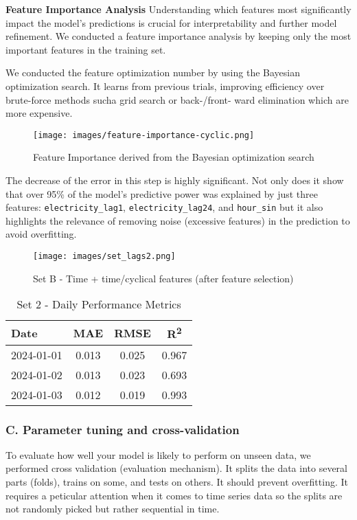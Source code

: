 \textbf{Feature Importance Analysis} Understanding which features 
most significantly impact the model's predictions is crucial for 
interpretability and further model refinement. We conducted a feature 
importance analysis by keeping only the most important features in the 
training set.

We conducted  the feature optimization number by using the Bayesian optimization search.
It learns from previous trials, improving efficiency over brute-force methods sucha grid 
search or back-/front- ward elimination which are more expensive.

\begin{figure}[h!]
    \centering
    \texttt{[image: images/feature-importance-cyclic.png]}
    \caption{Feature Importance derived from the Bayesian optimization search}
    \label{fig:feature-importance}
\end{figure}

The decrease of the error in this step is highly significant. Not only does it 
show that over 95\% of the model's predictive power was explained by just three 
features: \texttt{electricity\_lag1}, \texttt{electricity\_lag24}, and \texttt{hour\_sin} 
but it also highlights the relevance of removing noise (excessive features) in the prediction
to avoid overfitting. 

\begin{figure}[H]
    \centering
    \texttt{[image: images/set\_lags2.png]}
    \caption{Set B - Time + time/cyclical features (after feature selection)}
    \label{fig:set2-forecast-profile}
\end{figure}

\begin{table}[H]
    \centering
    \begin{tabular}{lccc}
        Date        & MAE    & RMSE   & R\textsuperscript{2} \\
        \hline
        2024-01-01  & 0.013  & 0.025  & 0.967 \\
        2024-01-02  & 0.013  & 0.023  & 0.693 \\
        2024-01-03  & 0.012  & 0.019  & 0.993 \\
    \end{tabular}
    \caption{Set 2 - Daily Performance Metrics}
\end{table}

\subsubsection*{C. Parameter tuning and cross-validation}
To evaluate how well your model is likely to perform on unseen data, we performed 
cross validation (evaluation mechanism). It splits the data into several parts (folds), 
trains on some, and tests on others. It should prevent overfitting. It requires a peticular
attention when it comes to time series data so the splits are not randomly picked but rather 
sequential in time.

